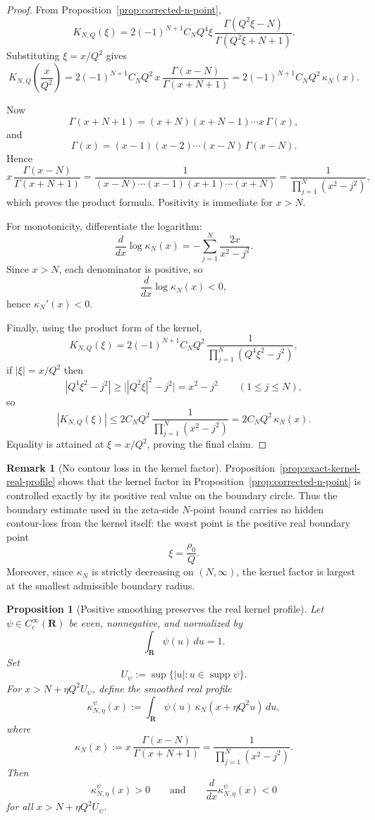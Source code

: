 \documentclass[11pt,a4paper]{amsart}
\theoremstyle{plain}
\newtheorem{proposition}[theorem]{Proposition}
\theoremstyle{definition}
\newtheorem{remark}[theorem]{Remark}
\begin{document}
\begin{proof}
From Proposition~\ref{prop:corrected-n-point},
\[
K_{N,Q}(\xi)
=
2(-1)^{N+1}C_NQ^4\xi\,
\frac{\Gamma(Q^2\xi-N)}{\Gamma(Q^2\xi+N+1)}.
\]
Substituting $\xi=x/Q^2$ gives
\[
K_{N,Q}\!\left(\frac{x}{Q^2}\right)
=
2(-1)^{N+1}C_NQ^2\,
x\,\frac{\Gamma(x-N)}{\Gamma(x+N+1)}
=
2(-1)^{N+1}C_NQ^2\,\kappa_N(x).
\]

Now
\[
\Gamma(x+N+1)
=
(x+N)(x+N-1)\cdots x\,\Gamma(x),
\]
and
\[
\Gamma(x)
=
(x-1)(x-2)\cdots (x-N)\,\Gamma(x-N).
\]
Hence
\[
x\,\frac{\Gamma(x-N)}{\Gamma(x+N+1)}
=
\frac{1}{(x-N)\cdots(x-1)(x+1)\cdots(x+N)}
=
\frac{1}{\prod_{j=1}^N(x^2-j^2)},
\]
which proves the product formula. Positivity is immediate for $x>N$.

For monotonicity, differentiate the logarithm:
\[
\frac{d}{dx}\log\kappa_N(x)
=
-\sum_{j=1}^N \frac{2x}{x^2-j^2}.
\]
Since $x>N$, each denominator is positive, so
\[
\frac{d}{dx}\log\kappa_N(x)<0,
\]
hence $\kappa_N'(x)<0$.

Finally, using the product form of the kernel,
\[
K_{N,Q}(\xi)
=
2(-1)^{N+1}C_NQ^2\,
\frac{1}{\prod_{j=1}^N(Q^4\xi^2-j^2)},
\]
if $|\xi|=x/Q^2$ then
\[
|Q^4\xi^2-j^2|
\ge \bigl||Q^2\xi|^2-j^2\bigr|
=
x^2-j^2
\qquad (1\le j\le N),
\]
so
\[
|K_{N,Q}(\xi)|
\le
2C_NQ^2\,
\frac{1}{\prod_{j=1}^N(x^2-j^2)}
=
2C_NQ^2\,\kappa_N(x).
\]
Equality is attained at $\xi=x/Q^2$, proving the final claim.
\end{proof}

\begin{remark}[No contour loss in the kernel factor]
\label{rem:no-contour-loss-kernel-factor}
Proposition~\ref{prop:exact-kernel-real-profile} shows that the kernel factor
in Proposition~\ref{prop:corrected-n-point} is controlled exactly by its
positive real value on the boundary circle.  Thus the boundary estimate used in
the zeta-side $N$-point bound carries no hidden contour-loss from the kernel
itself: the worst point is the positive real boundary point
\[
\xi=\frac{\rho_0}{Q}.
\]
Moreover, since $\kappa_N$ is strictly decreasing on $(N,\infty)$, the
kernel factor is largest at the smallest admissible boundary radius.
\end{remark}

\begin{proposition}[Positive smoothing preserves the real kernel profile]
\label{prop:smoothed-real-kernel-profile}
Let $\psi\in C_c^\infty(\mathbf R)$ be even, nonnegative, and normalized by
\[
\int_{\mathbf R}\psi(u)\,du=1.
\]
Set
\[
U_\psi:=\sup\{|u|:u\in \operatorname{supp}\psi\}.
\]
For $x>N+\eta Q^2U_\psi$, define the smoothed real profile
\[
\kappa_{N,\eta}^{\psi}(x)
:=
\int_{\mathbf R}\psi(u)\,\kappa_N(x+\eta Q^2u)\,du,
\]
where
\[
\kappa_N(x):=x\,\frac{\Gamma(x-N)}{\Gamma(x+N+1)}
=\frac{1}{\prod_{j=1}^N(x^2-j^2)}.
\]
Then
\[
\kappa_{N,\eta}^{\psi}(x)>0
\qquad\text{and}\qquad
\frac{d}{dx}\kappa_{N,\eta}^{\psi}(x)<0
\]
for all $x>N+\eta Q^2U_\psi$.
\end{proposition}
\end{document}
